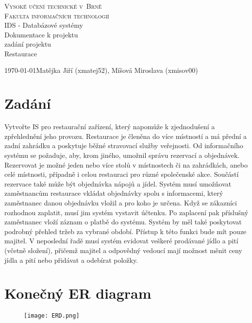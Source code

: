 \documentclass[11pt, a4paper]{article}[]
\begin{document}
	\thispagestyle{empty}

	\begin{center}
		\Huge
			\textsc{Vysoké učení technické v~Brně\\}
		\huge
			\textsc{Fakulta informačních technologií\\}
		\LARGE
			IDS - Databázové systémy \\
		\Huge
			Dokumentace k projektu \\

		\LARGE	zadání projektu\\
			Restaurace \\
	\end{center}
		{\Large \today \hfill Matějka Jiří (xmatej52), Míšová Miroslava (xmisov00)} %
	\pagebreak
	\setcounter{page}{1}

	\section{Zadání}
	Vytvořte IS pro restaurační zařízení, který napomůže k zjednodušení a zpřehlednění jeho provozu. Restaurace je členěna do více místností a má přední a zadní zahrádku a poskytuje běžné stravovací služby veřejnosti. Od informačního systému se požaduje, aby, krom jiného, umožnil správu rezervací a objednávek. Rezervovat je možné jeden nebo více stolů v místnostech či na zahrádkách, anebo celé místnosti, případně i celou restauraci pro různé společenské akce. Součástí rezervace také může být objednávka nápojů a jídel. Systém musí umožňovat zaměstnancům restaurace vkládat objednávky spolu s informacemi, který zaměstnanec danou objednávku vložil a pro koho je určena. Když se zákazníci rozhodnou zaplatit, musí jim systém vystavit účtenku. Po zaplacení pak příslušný zaměstnanec vloží záznam o platbě do systému. Systém by měl také poskytovat podrobný přehled tržeb za vybrané období. Přístup k této funkci bude mít pouze majitel. V neposlední řadě musí systém evidovat veškeré prodávané jídlo a pití (včetně složení), přičemž majitel a odpovědný vedoucí mají možnost měnit ceny jídla a pití nebo přidávat a odebírat položky.
    \pagebreak
	\section{Konečný ER diagram}
	\begin{figure}[h]
	\begin{center}
		\texttt{[image: ERD.png]}
		\label{fig:obr_ERD}
	\end{center}
	\end{figure}
    \pagebreak
\end{document}
